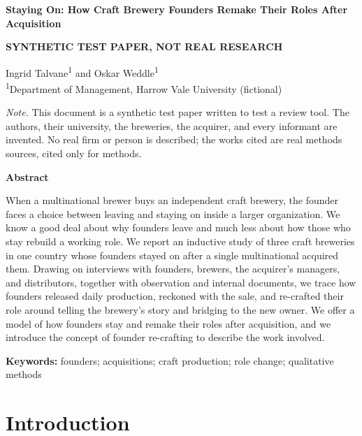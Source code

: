 \documentclass[12pt]{article}
\begin{document}
\begin{center}
{\Large\bfseries Staying On: How Craft Brewery Founders Remake Their Roles After Acquisition\par}
\vspace{1em}
{\large\bfseries SYNTHETIC TEST PAPER, NOT REAL RESEARCH\par}
\vspace{2em}
Ingrid Talvane\textsuperscript{1} and Oskar Weddle\textsuperscript{1}\\[0.5em]
\textsuperscript{1}Department of Management, Harrow Vale University (fictional)\\[1.5em]
\end{center}

\noindent\textit{Note.} This document is a synthetic test paper written to test a review tool. The authors, their university, the breweries, the acquirer, and every informant are invented. No real firm or person is described; the works cited are real methods sources, cited only for methods.

\vspace{2em}
\begin{center}\textbf{Abstract}\end{center}

\noindent When a multinational brewer buys an independent craft brewery, the founder faces a choice between leaving and staying on inside a larger organization. We know a good deal about why founders leave and much less about how those who stay rebuild a working role. We report an inductive study of three craft breweries in one country whose founders stayed on after a single multinational acquired them. Drawing on interviews with founders, brewers, the acquirer's managers, and distributors, together with observation and internal documents, we trace how founders released daily production, reckoned with the sale, and re-crafted their role around telling the brewery's story and bridging to the new owner. We offer a model of how founders stay and remake their roles after acquisition, and we introduce the concept of founder re-crafting to describe the work involved.

\vspace{1em}
\noindent\textbf{Keywords:} founders; acquisitions; craft production; role change; qualitative methods
\newpage

\section{Introduction}
\end{document}
